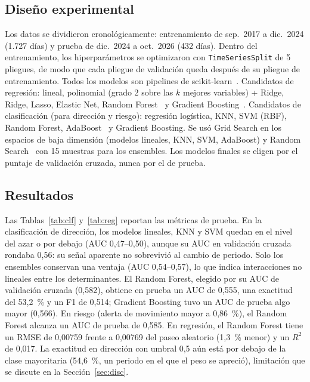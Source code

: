 \documentclass[conference]{IEEEtran}
\begin{document}
\subsection{Diseño experimental}
Los datos se dividieron cronológicamente: entrenamiento de sep.~2017 a dic.~2024 (1.727 días) y prueba de dic.~2024 a oct.~2026 (432 días). Dentro del entrenamiento, los hiperparámetros se optimizaron con \texttt{TimeSeriesSplit} de 5 pliegues, de modo que cada pliegue de validación queda después de su pliegue de entrenamiento. Todos los modelos son pipelines de scikit-learn~\cite{pedregosa2011}. Candidatos de regresión: lineal, polinomial (grado 2 sobre las $k$ mejores variables) + Ridge, Ridge, Lasso, Elastic Net, Random Forest~\cite{breiman2001} y Gradient Boosting~\cite{friedman2001}. Candidatos de clasificación (para dirección y riesgo): regresión logística, KNN, SVM (RBF), Random Forest, AdaBoost~\cite{freund1997} y Gradient Boosting. Se usó Grid Search en los espacios de baja dimensión (modelos lineales, KNN, SVM, AdaBoost) y Random Search~\cite{bergstra2012} con 15 muestras para los ensembles. Los modelos finales se eligen por el puntaje de validación cruzada, nunca por el de prueba.

\subsection{Resultados}
Las Tablas~\ref{tab:clf} y~\ref{tab:reg} reportan las métricas de prueba. En la clasificación de dirección, los modelos lineales, KNN y SVM quedan en el nivel del azar o por debajo (AUC 0,47--0,50), aunque su AUC en validación cruzada rondaba 0,56: su señal aparente no sobrevivió al cambio de periodo. Solo los ensembles conservan una ventaja (AUC 0,54--0,57), lo que indica interacciones no lineales entre los determinantes. El Random Forest, elegido por su AUC de validación cruzada (0,582), obtiene en prueba un AUC de 0,555, una exactitud del 53,2~\% y un F1 de 0,514; Gradient Boosting tuvo un AUC de prueba algo mayor (0,566). En riesgo (alerta de movimiento mayor a 0,86~\%), el Random Forest alcanza un AUC de prueba de 0,585. En regresión, el Random Forest tiene un RMSE de 0,00759 frente a 0,00769 del paseo aleatorio (1,3~\% menor) y un $R^2$ de 0,017. La exactitud en dirección con umbral 0,5 aún está por debajo de la clase mayoritaria (54,6~\%, un periodo en el que el peso se apreció), limitación que se discute en la Sección~\ref{sec:disc}.
\end{document}
